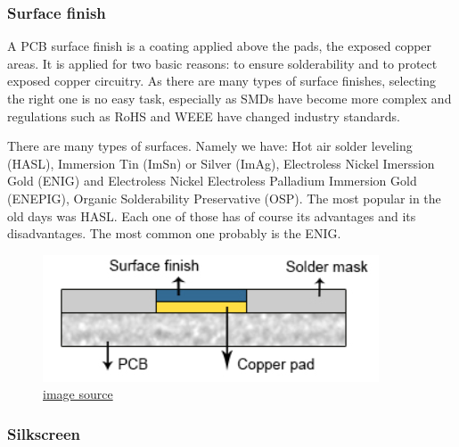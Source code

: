 \documentclass[final]{cubedoc}
\begin{document}
	
	
	
	\subsubsection{Surface finish}
	
	
	A PCB surface finish is a coating applied above the pads, the exposed copper areas. It is applied for two basic reasons: to ensure solderability and to protect exposed copper circuitry. As there are many types of surface finishes, selecting the right one is no easy task, especially as SMDs have become more complex and regulations such as RoHS and WEEE have changed industry standards.
	
	There are many types of surfaces. Namely we have: Hot air solder leveling (HASL), Immersion Tin (ImSn) or Silver (ImAg), Electroless Nickel Imerssion Gold (ENIG) and Electroless Nickel Electroless Palladium Immersion Gold (ENEPIG), Organic Solderability Preservative (OSP). The most popular in the old days was HASL.
	Each one of those has of course its advantages and its disadvantages. The most common one probably is the ENIG.
	
	
	\begin{figure}[h!]
		\centering
		\includegraphics[keepaspectratio, height=0.2\textheight, width=.6\textwidth]{assets/surface_finish.png}
		\caption{\href{https://www.pcbcart.com/article/content/surface-finish-intro-and-comparision.html}{image source}}
	\end{figure}
	
	\subsubsection{Silkscreen}
	
\end{document}
